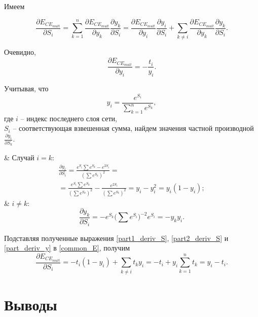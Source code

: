 Имеем

\begin{equation}
	\label{common_E}
	\frac{\partial E_{CE_{mult}}}{\partial S_i} = \sum_{k=1}^{n} \frac{\partial E_{CE_{mult}}}{\partial y_k}\frac{\partial y_k}{\partial S_i} = \frac{\partial E_{CE_{mult}}}{\partial y_i}\frac{\partial y_i}{\partial S_i} + \sum_{k\neq i}\frac{\partial E_{CE_{mult}}}{\partial y_k}\frac{\partial y_k}{\partial S_i}.
\end{equation}

Очевидно, 
\begin{equation}
\label{part_deriv_y}
\frac{\partial E_{CE_{mult}}}{\partial y_i} = -\frac{t_i}{y_i}.
\end{equation}

Учитывая, что
\begin{equation}
	y_i = \frac{e^{S_i}}{\sum_{k=1}^{n} e^{S_k}},
\end{equation}
где $i$ -- индекс последнего слоя сети,\\
$S_i$ -- соответствующая взвешенная сумма, найдем значения частной производной $\frac{\partial y_i}{\partial S_k}$.
\begin{easylistNum}
	& Случай $i = k$:
	\begin{multline}
		\label{part1_deriv_S}
		\frac{\partial y_i}{\partial S_i} = \frac{e^{S_i}\sum e^{S_k} - e^{2S_i}}{(\sum e^{S_k})^2} = \\ = \frac{e^{S_i}\sum e^{S_k}}{(\sum e^{S_k})^2}-\frac{e^{2S_i}}{(\sum e^{S_k})^2}=y_i - y_i^2 = y_i(1-y_i);
	\end{multline}
	& $i \neq k$:
	\begin{equation}
		\label{part2_deriv_S}
		\frac{\partial y_k}{\partial S_i} = -e^{S_k}\Big(\sum e^{S_i}\Big)^{-2}e^{S_i} = -y_ky_i.
	\end{equation}
\end{easylistNum}

Подставляя полученные выражения \ref{part1_deriv_S}, \ref{part2_deriv_S} и \ref{part_deriv_y} в \ref{common_E}, получим
\begin{equation}
	\frac{\partial E_{CE_{mult}}}{\partial S_i} = -t_i(1-y_i) + \sum_{k\neq i}t_ky_i = -t_i + y_i\sum_{k=1}^{n}t_k = y_i - t_i.
\end{equation}

\section{Выводы}

